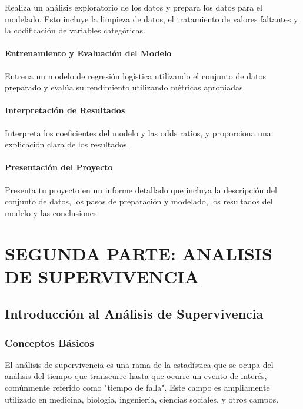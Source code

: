 \documentclass[a4paper]{report} %
\begin{document}
Realiza un an\'alisis exploratorio de los datos y prepara los datos para el modelado. Esto incluye la limpieza de datos, el tratamiento de valores faltantes y la codificaci\'on de variables categ\'oricas.

\subsection{Entrenamiento y Evaluaci\'on del Modelo}

Entrena un modelo de regresi\'on log\'istica utilizando el conjunto de datos preparado y eval\'ua su rendimiento utilizando m\'etricas apropiadas.

\subsection{Interpretaci\'on de Resultados}

Interpreta los coeficientes del modelo y las odds ratios, y proporciona una explicaci\'on clara de los resultados.

\subsection{Presentaci\'on del Proyecto}

Presenta tu proyecto en un informe detallado que incluya la descripci\'on del conjunto de datos, los pasos de preparaci\'on y modelado, los resultados del modelo y las conclusiones.



\part{SEGUNDA PARTE: ANALISIS DE SUPERVIVENCIA}

\chapter{Introducci\'on al An\'alisis de Supervivencia}

\section{Conceptos B\'asicos}
El an\'alisis de supervivencia es una rama de la estad\'istica que se ocupa del an\'alisis del tiempo que transcurre hasta que ocurre un evento de inter\'es, com\'unmente referido como "tiempo de falla". Este campo es ampliamente utilizado en medicina, biolog\'ia, ingenier\'ia, ciencias sociales, y otros campos.
\end{document}
